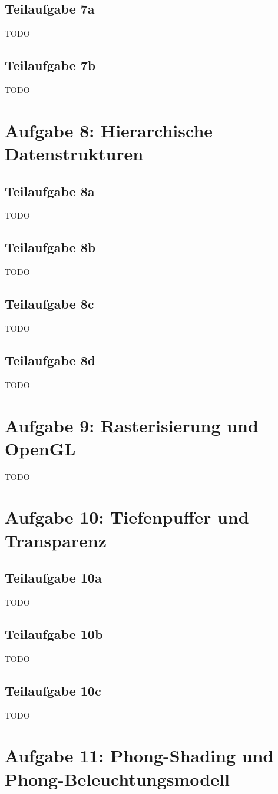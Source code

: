 \documentclass[a4paper]{scrartcl}
\begin{document}
\subsection*{Teilaufgabe 7a}
TODO
\subsection*{Teilaufgabe 7b}
TODO

\section*{Aufgabe 8: Hierarchische Datenstrukturen}
\subsection*{Teilaufgabe 8a}
TODO
\subsection*{Teilaufgabe 8b}
TODO
\subsection*{Teilaufgabe 8c}
TODO
\subsection*{Teilaufgabe 8d}
TODO

\section*{Aufgabe 9: Rasterisierung und OpenGL}
TODO

\section*{Aufgabe 10: Tiefenpuffer und Transparenz}
\subsection*{Teilaufgabe 10a}
TODO
\subsection*{Teilaufgabe 10b}
TODO
\subsection*{Teilaufgabe 10c}
TODO

\section*{Aufgabe 11: Phong-Shading und Phong-Beleuchtungsmodell}
\inputminted[linenos, numbersep=5pt, tabsize=4, frame=lines, label=shader.vert]{glsl}{shader.vert}
\end{document}
